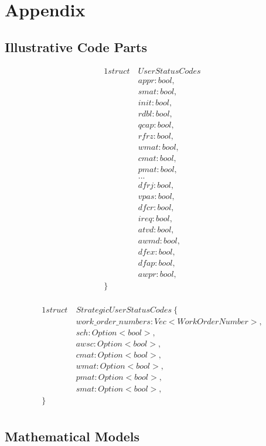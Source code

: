 \newpage
\section{Appendix}
\subsection{Illustrative Code Parts}
\begin{alignat*}{1}
struct\ & UserStatusCodes \\
    & appr: bool, \\
    & smat: bool, \\
    & init: bool, \\
    & rdbl: bool, \\
    & qcap: bool, \\
    & rfrz: bool, \\
    & wmat: bool, \\
    & cmat: bool, \\
    & pmat: bool, \\
    & ... \\
    & dfrj: bool, \\
    & vpas: bool, \\
    & dfcr: bool, \\
    & ireq: bool, \\
    & atvd: bool, \\
    & awmd: bool, \\
    & dfex: bool, \\
    & dfap: bool, \\
    & awpr: bool, \\
\} \ \ &\\
\end{alignat*}

\begin{alignat*}{1}
struct\ & StrategicUserStatusCodes \ \{ \\
    & work\_order\_numbers: Vec<WorkOrderNumber>,\\
    & sch: Option<bool>,\\
    & awsc: Option<bool>,\\
    & cmat: Option<bool>,\\
    & wmat: Option<bool>,\\
    & pmat: Option<bool>,\\
    & smat: Option<bool>,\\
\}\ \ &\\
\end{alignat*}
\newpage
\subsection{Mathematical Models}

